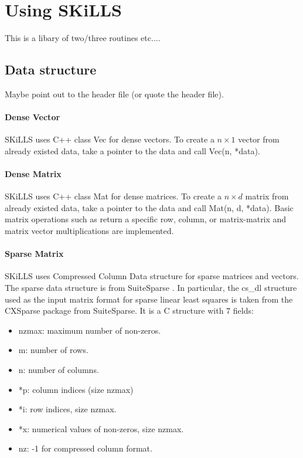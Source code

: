 \documentclass[english,11pt]{article}
\begin{document}
\section{Using SKiLLS}

\color{red} This is a libary of two/three routines etc....\color{black}

\subsection{Data structure}

\color{red} Maybe point out to the header file \color{black} (or quote the header file). 
\paragraph{Dense Vector}
SKiLLS uses C++ class Vec for dense vectors. To create a $n\times 1$ vector from already existed data, take a pointer to the data and call Vec(n, *data). 

\paragraph{Dense Matrix}
SKiLLS uses C++ class Mat for dense matrices. To create a $n \times d$ matrix from already existed data, take a pointer to the data and call Mat(n, d, *data). Basic matrix operations such as return a specific row, column, or matrix-matrix and matrix vector multiplications are implemented.  

\paragraph{Sparse Matrix}
SKiLLS uses Compressed Column Data structure for sparse matrices and vectors. The sparse data structure is from SuiteSparse \cite{10.1145/2049662.2049670}. In particular, the cs_dl structure used as the input matrix format for sparse linear least squares is taken from the CXSparse package from SuiteSparse. It is a C structure with 7 fields: 

\begin{itemize}
	\setlength\itemsep{-0.5em}
	\item nzmax: maximum number of non-zeros. 

	\item m: number of rows. 

	\item n: number of columns. 

	\item *p: column indices (size nzmax)

	\item *i: row indices, size nzmax. 

	\item *x: numerical values of non-zeros, size nzmax. 

	\item nz: -1 for compressed column format. 
\end{itemize}
\end{document}

